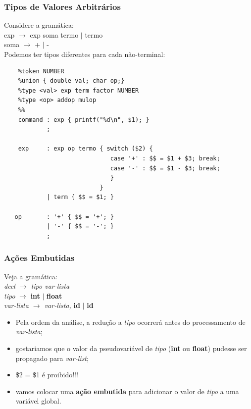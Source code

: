 \documentclass[table]{beamer}
\begin{document}
\begin{frame}[fragile]
   \frametitle{Tipos de Valores Arbitrários}
   Considere a gramática: \\
   exp $\rightarrow$ exp soma termo $|$ termo \\
   soma $\rightarrow$ + $|$ - \\
   Podemos ter tipos diferentes para cada não-terminal:
   \scriptsize
    \begin{verbatim}
    %token NUMBER
    %union { double val; char op;}
    %type <val> exp term factor NUMBER
    %type <op> addop mulop
    %%
    command : exp { printf("%d\n", $1); }
            ;

    exp     : exp op termo { switch ($2) {
                              case '+' : $$ = $1 + $3; break;
                              case '-' : $$ = $1 - $3; break;
                              }
                           }
            | term { $$ = $1; }

   op       : '+' { $$ = '+'; }
            | '-' { $$ = '-'; }
            ;
    \end{verbatim}
\end{frame}

\begin{frame}
   \frametitle{Ações Embutidas}
   Veja a gramática: \\
   \textit{decl $\rightarrow$ tipo var-lista} \\
   \textit{tipo} $\rightarrow$ \textbf{int} $|$ \textbf{float} \\
   \textit{var-lista $\rightarrow$ var-lista,} \textbf{id} $|$ \textbf{id}
   \begin{itemize}
      \item Pela ordem da análise, a redução a \textit{tipo} ocorrerá antes do processamento de \textit{var-lista};
      \item gostariamos que o valor da pseudovariável de \textit{tipo} (\textbf{int} ou \textbf{float}) pudesse ser propagado para \textit{var-list};
      \item \$2 = \$1 é proibido!!!
      \item vamos colocar uma \textbf{ação embutida} para adicionar o valor de \textit{tipo} a uma variável global.
   \end{itemize}
\end{frame}
\end{document}
